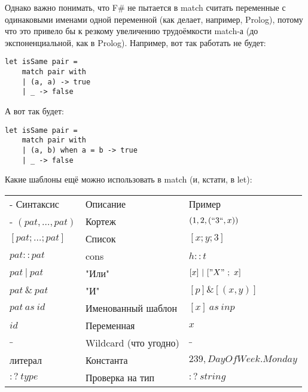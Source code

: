 \documentclass[a5paper]{article}
\begin{document}
Однако важно понимать, что F\# не пытается в match считать переменные с одинаковыми именами одной переменной (как делает, например, Prolog), потому что это привело бы к резкому увеличению трудоёмкости match-а (до экспоненциальной, как в Prolog). Например, вот так работать не будет:

\begin{verbatim}
let isSame pair =
    match pair with
    | (a, a) -> true
    | _ -> false
\end{verbatim}

А вот так будет:

\begin{verbatim}
let isSame pair =
    match pair with
    | (a, b) when a = b -> true
    | _ -> false
\end{verbatim}

Какие шаблоны ещё можно использовать в match (и, кстати, в let):

\begin{tabu} {| X[0.9 l p] | X[1 l p] | X[1 l p] |}
	\tabucline-
	Синтаксис                               & Описание                  & Пример                  \\
	\tabucline-
	\everyrow{\tabucline-}
	$(pat, \ldots, pat)$                    & Кортеж                    & $(1, 2, (``3``, x))$    \\
	$[pat; \ldots; pat]$                    & Список                    & $[x; y; 3]$             \\
	$pat :: pat$                            & cons                      & $h :: t$                \\
	$pat\ |\ pat$                           & "Или"                     & $[x]\ |\ ["X"\ ;\ x]$ \\
	$pat\ \&\ pat$                          & "И"                       & $[p] \& [(x, y)]$       \\
	$pat\ as\ id$                           & Именованный шаблон        & $[x]\ as\ inp$          \\
	$id$                                    & Переменная                & $x$                     \\
	$\_$                                    & Wildcard (что угодно)     & $\_$                    \\
	литерал                                 & Константа                 & $239, DayOfWeek.Monday$ \\
	$:?\ type$                              & Проверка на тип           & $:?\ string$            \\
\end{tabu}
\end{document}
